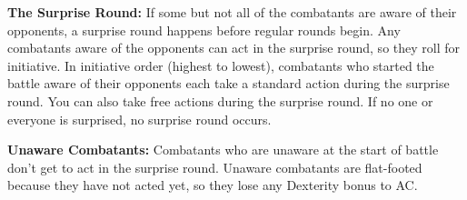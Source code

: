 \textbf{The Surprise Round:} If some but not all of the combatants are aware of their opponents, a surprise round happens before regular rounds begin. Any combatants aware of the opponents can act in the surprise round, so they roll for initiative. In initiative order (highest to lowest), combatants who started the battle aware of their opponents each take a standard action during the surprise round. You can also take free actions during the surprise round. If no one or everyone is surprised, no surprise round occurs.

\textbf{Unaware Combatants:} Combatants who are unaware at the start of battle don't get to act in the surprise round. Unaware combatants are flat-footed because they have not acted yet, so they lose any Dexterity bonus to AC.
